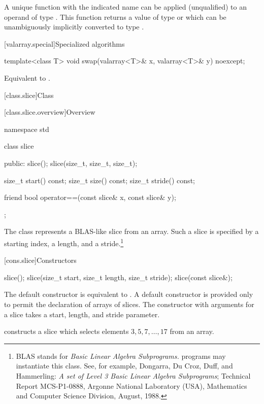 \begin{itemdescr}
\pnum
\mandates
A unique function with the indicated name can be applied (unqualified)
to an operand of type .
This function returns a value of type 
or which can be unambiguously implicitly converted to type .

\end{itemdescr}

[valarray.special]{Specialized algorithms}

%
\begin{itemdecl}
template<class T> void swap(valarray<T>& x, valarray<T>& y) noexcept;
\end{itemdecl}

\begin{itemdescr}
\pnum
\effects
Equivalent to .
\end{itemdescr}


[class.slice]{Class }

[class.slice.overview]{Overview}

%
\begin{codeblock}
namespace std {
  class slice {
  public:
    slice();
    slice(size_t, size_t, size_t);

    size_t start() const;
    size_t size() const;
    size_t stride() const;

    friend bool operator==(const slice& x, const slice& y);
  };
}
\end{codeblock}

\pnum
The 
class represents a BLAS-like slice from an array.
Such a slice is specified by a starting index, a length, and a
stride.\footnote{BLAS stands for
\textit{Basic Linear Algebra Subprograms.}
\Cpp{} programs may instantiate this class.
See, for example,
Dongarra, Du Croz, Duff, and Hammerling:
\textit{A set of Level 3 Basic Linear Algebra Subprograms};
Technical Report MCS-P1-0888,
Argonne National Laboratory (USA),
Mathematics and Computer Science Division,
August, 1988.}

[cons.slice]{Constructors}

%
\begin{itemdecl}
slice();
slice(size_t start, size_t length, size_t stride);
slice(const slice&);
\end{itemdecl}

\begin{itemdescr}
\pnum
The default constructor is equivalent to .
A default constructor is provided only to permit the declaration of arrays of slices.
The constructor with arguments for a slice takes a start, length, and stride
parameter.

\pnum
\begin{example}
constructs a slice which selects elements $3, 5, 7, \dotsc, 17$ from an array.
\end{example}
\end{itemdescr}

